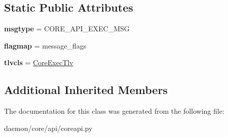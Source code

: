 \subsection*{Static Public Attributes}
\begin{DoxyCompactItemize}
\item 
\hypertarget{classcore_1_1api_1_1coreapi_1_1_core_exec_message_ab828609c7616a72f30a6fc0244282dfb}{{\bfseries msgtype} = C\+O\+R\+E\+\_\+\+A\+P\+I\+\_\+\+E\+X\+E\+C\+\_\+\+M\+S\+G}\label{classcore_1_1api_1_1coreapi_1_1_core_exec_message_ab828609c7616a72f30a6fc0244282dfb}

\item 
\hypertarget{classcore_1_1api_1_1coreapi_1_1_core_exec_message_a17791675d8e13f93bc018f672192aab1}{{\bfseries flagmap} = message\+\_\+flags}\label{classcore_1_1api_1_1coreapi_1_1_core_exec_message_a17791675d8e13f93bc018f672192aab1}

\item 
\hypertarget{classcore_1_1api_1_1coreapi_1_1_core_exec_message_af8eec33a755d84ed5d038320f1f10cd7}{{\bfseries tlvcls} = \hyperlink{classcore_1_1api_1_1coreapi_1_1_core_exec_tlv}{Core\+Exec\+Tlv}}\label{classcore_1_1api_1_1coreapi_1_1_core_exec_message_af8eec33a755d84ed5d038320f1f10cd7}

\end{DoxyCompactItemize}
\subsection*{Additional Inherited Members}


The documentation for this class was generated from the following file\+:\begin{DoxyCompactItemize}
\item 
daemon/core/api/coreapi.\+py\end{DoxyCompactItemize}
